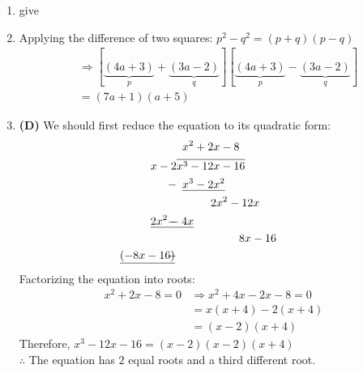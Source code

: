 \begin{multicols}{2}
\begin{enumerate}[label={\textbf{\arabic*.}}]
\item give

\item Applying the difference of two squares: \(p^2 - q^2 = (p + q)(p - q)\)
\begin{align*}
&\Rightarrow [\underbrace{(4a + 3)}_{p} + \underbrace{(3a - 2)}_{q}][\underbrace{(4a + 3)}_{p} - \underbrace{(3a - 2)}_{q}] \\
&= (7a + 1)(a + 5)
\end{align*}

\item \textbf{(D)} We should first reduce the equation to its quadratic form:
\begin{align*}
& \hspace{5pt} x^2 + 2x - 8 \\
x - 2 & \overline{x^3 - 12x - 16} \\
- & \hspace{5pt} \underline{x^3 - 2x^2} \\
& \hspace{30pt} 2x^2 - 12x \\
- & \hspace{-23pt} \underline{2x^2 - 4x} \\
& \hspace{55pt} 8x - 16 \\
- & \hspace{-50pt} \underline{(-8x - 16)}
\end{align*}
Factorizing the equation into roots:
\begin{align*}
x^2 + 2x - 8 = 0 &\Rightarrow x^2 + 4x - 2x - 8 = 0 \\
&= x(x + 4) - 2(x + 4) \\
&= (x - 2)(x + 4)
\end{align*}
Therefore, \(x^3 - 12x - 16 = (x - 2)(x - 2)(x + 4) \) \\
\(\therefore\) The equation has \(2\) equal roots and a third different root.


\end{enumerate}
\end{multicols}
